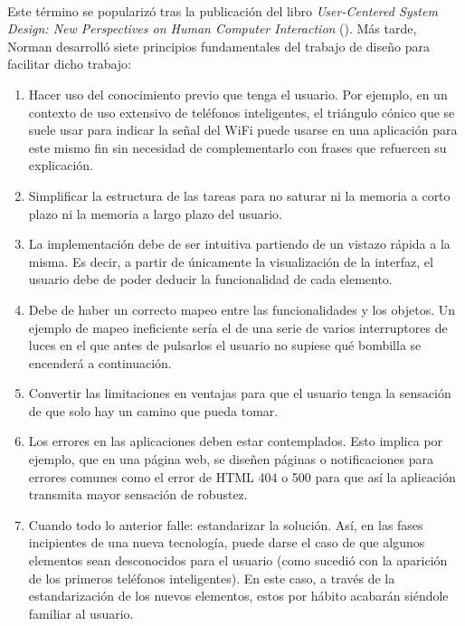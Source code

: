 \paragraph{}
Este término se popularizó tras la publicación del libro \textit{User-Centered System Design: New Perspectives on Human Computer Interaction} (\citeyear{norman1986user}). Más tarde, Norman desarrolló siete principios fundamentales del trabajo de diseño para facilitar dicho trabajo\citep{norman2013design}:
\begin{enumerate}
    \item Hacer uso del conocimiento previo que tenga el usuario. Por ejemplo, en un contexto de uso extensivo de teléfonos inteligentes, el triángulo cónico que se suele usar para indicar la señal del WiFi puede usarse en una aplicación para este mismo fin sin necesidad de complementarlo con frases que refuercen su explicación.
    \item Simplificar la estructura de las tareas para no saturar ni la memoria a corto plazo ni la memoria a largo plazo del usuario.
    \item La implementación debe de ser intuitiva partiendo de un vistazo rápida a la misma. Es decir, a partir de únicamente la visualización de la interfaz, el usuario debe de poder deducir la funcionalidad de cada elemento.
    \item Debe de haber un correcto mapeo entre las funcionalidades y los objetos. Un ejemplo de mapeo ineficiente sería el de una serie de varios interruptores de luces en el que antes de pulsarlos el usuario no supiese qué bombilla se encenderá a continuación.
    \item Convertir las limitaciones en ventajas para que el usuario tenga la sensación de que solo hay un camino que pueda tomar.
    \item Los errores en las aplicaciones deben estar contemplados. Esto implica por ejemplo, que en una página web, se diseñen páginas o notificaciones para errores comunes como el error de HTML 404 o 500 para que así la aplicación transmita mayor sensación de robustez.
    \item Cuando todo lo anterior falle: estandarizar la solución. Así, en las fases incipientes de una nueva tecnología, puede darse el caso de que algunos elementos sean desconocidos para el usuario (como sucedió con la aparición de los primeros teléfonos inteligentes). En este caso, a través de la estandarización de los nuevos elementos, estos por hábito acabarán siéndole familiar al usuario.
\end{enumerate}

